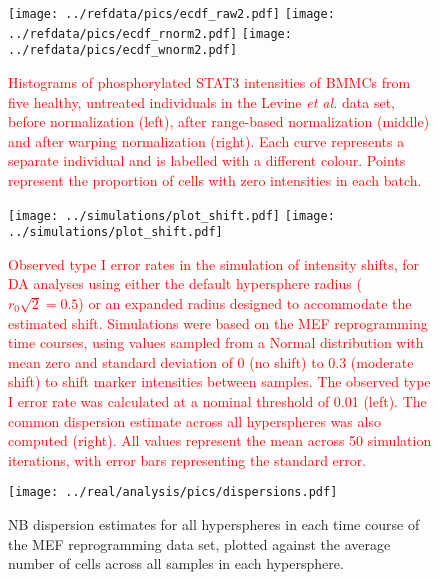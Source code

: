 \documentclass{article}
\newcommand\revised[1]{\textcolor{red}{#1}}
\begin{document}
\begin{figure}[tbp]
    \begin{center}
        \texttt{[image: ../refdata/pics/ecdf\_raw2.pdf]}
        \texttt{[image: ../refdata/pics/ecdf\_rnorm2.pdf]}
        \texttt{[image: ../refdata/pics/ecdf\_wnorm2.pdf]}
    \end{center}
    \caption{\revised{Histograms of phosphorylated STAT3 intensities of BMMCs from five healthy, untreated individuals in the Levine \textit{et al.} data set, before normalization (left), after range-based normalization (middle) and after warping normalization (right).
        Each curve represents a separate individual and is labelled with a different colour.
        Points represent the proportion of cells with zero intensities in each batch.
    }
    }
    \label{fig:quantile}
\end{figure}

\begin{figure}[tbp]
    \begin{center}
        \texttt{[image: ../simulations/plot\_shift.pdf]}
        \texttt{[image: ../simulations/plot\_shift.pdf]}
    \end{center}
    \caption{\revised{Observed type I error rates in the simulation of intensity shifts, for DA analyses using either the default hypersphere radius ($r_0\sqrt{2}=0.5$) or an expanded radius designed to accommodate the estimated shift.
        Simulations were based on the MEF reprogramming time courses, using values sampled from a Normal distribution with mean zero and standard deviation of 0 (no shift) to 0.3 (moderate shift) to shift marker intensities between samples. 
        The observed type I error rate was calculated at a nominal threshold of 0.01 (left).
        The common dispersion estimate across all hyperspheres was also computed (right).
        All values represent the mean across 50 simulation iterations, with error bars representing the standard error.
    }
}
\label{fig:shift_sim}
\end{figure}

\begin{figure}[tbp]
    \begin{center}
    \texttt{[image: ../real/analysis/pics/dispersions.pdf]}
    \end{center}
    \caption{NB dispersion estimates for all hyperspheres in each time course of the MEF reprogramming data set, plotted against the average number of cells across all samples in each hypersphere.}
\end{figure}
\end{document}

